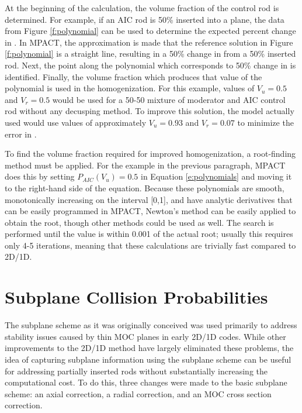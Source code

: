 At the beginning of the calculation, the volume fraction of the control rod is determined.  For example, if an AIC rod is 50\% inserted into a plane, the data from Figure \ref{f:polynomial} can be used to determine the expected percent change in \keff{}.  In MPACT, the approximation is made that the reference solution in Figure \ref{f:polynomial} is a straight line, resulting in a 50\% change in \keff{} from a 50\% inserted rod.  Next, the point along the polynomial which corresponds to 50\% change in \keff{} is identified.  Finally, the volume fraction which produces that value of the polynomial is used in the homogenization.  For this example, values of $V_u=0.5$ and $V_r=0.5$ would be used for a 50-50 mixture of moderator and AIC control rod without any decusping method.  To improve this solution, the model actually used would use values of approximately $V_u=0.93$ and $V_r=0.07$ to minimize the error in \keff{}.

To find the volume fraction required for improved homogenization, a root-finding method must be applied.  For the example in the previous paragraph, MPACT does this by setting $P_{AIC}\left(V_u\right) = 0.5$ in Equation \ref{e:polynomials} and moving it to the right-hand side of the equation.  Because these polynomials are smooth, monotonically increasing on the interval [0,1], and have analytic derivatives that can be easily programmed in MPACT, Newton's method \cite{2006friendlyIntroductionToNumericalAnalysis} can be easily applied to obtain the root, though other methods could be used as well.  The search is performed until the value is within 0.001 of the actual root; usually this requires only 4-5 iterations, meaning that these calculations are trivially fast compared to 2D/1D.

\section{Subplane Collision Probabilities}

The subplane scheme as it was originally conceived was used primarily to address stability issues caused by thin MOC planes in early 2D/1D codes.  While other improvements to the 2D/1D method have largely eliminated these problems, the idea of capturing subplane information using the subplane scheme can be useful for addressing partially inserted rods without substantially increasing the computational cost.  To do this, three changes were made to the basic subplane scheme: an axial correction, a radial correction, and an MOC cross section correction.

